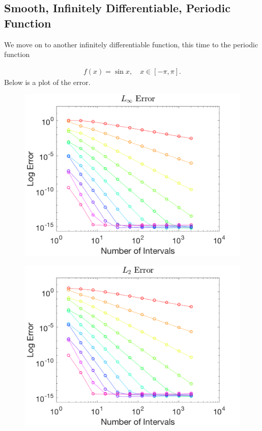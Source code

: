 \documentclass{article}
\begin{document}
\subsection{Smooth, Infinitely Differentiable, Periodic Function}
\noindent We move on to another infinitely differentiable function, this time to the periodic function

  \begin{align*}
    f(x) = \sin x , \quad x \in \left[ -\pi, \pi\right].
  \end{align*}
Below is a plot of the error.

\begin{figure}[H]
  \centering
  \begin{minipage}{.6\textwidth}
    \centering
    \includegraphics[width=\linewidth]{maxError_2.png}
    \label{fig:max2}
  \end{minipage}%
  \begin{minipage}{.6\textwidth}
    \centering
    \includegraphics[width=\linewidth]{squareError_2.png}
    \label{fig:square2}
  \end{minipage}%
\end{figure}
\end{document}
